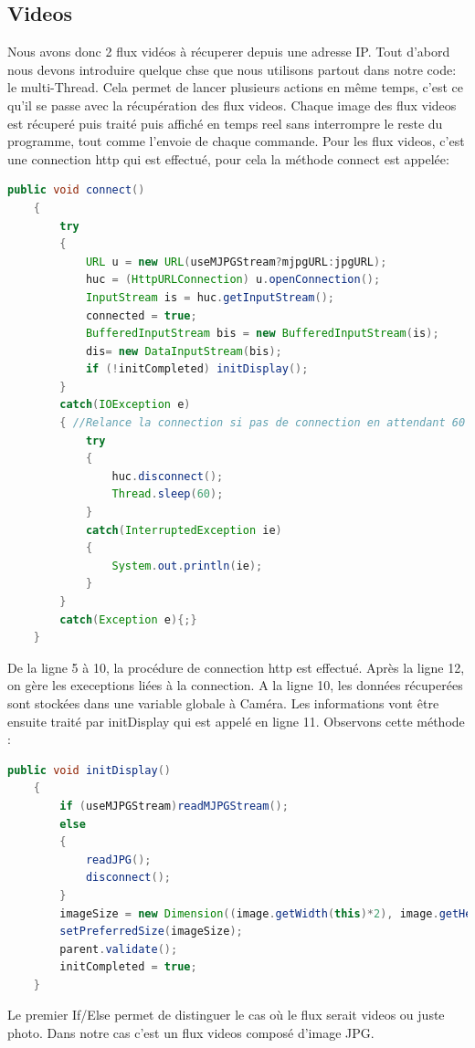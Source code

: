 \documentclass[a4paper,11pt]{report}
\begin{document}
		\subsection{Videos}
		Nous avons donc 2 flux vidéos à récuperer depuis une adresse IP. Tout d'abord nous devons introduire quelque chse que nous utilisons partout dans notre code: le multi-Thread. Cela permet de lancer plusieurs actions en même temps, c'est ce qu'il se passe avec la récupération des flux videos. Chaque image des flux videos est récuperé puis traité puis affiché en temps reel sans interrompre le reste du programme, tout comme l'envoie de chaque commande.
		\newline Pour les flux videos, c'est une connection http qui est effectué, pour cela la méthode connect est appelée:
		\begin{lstlisting}[language=java]
public void connect()
	{
		try
		{
			URL u = new URL(useMJPGStream?mjpgURL:jpgURL);
			huc = (HttpURLConnection) u.openConnection();
			InputStream is = huc.getInputStream();
			connected = true;
			BufferedInputStream bis = new BufferedInputStream(is);
			dis= new DataInputStream(bis);
			if (!initCompleted) initDisplay();
		}
		catch(IOException e)
		{ //Relance la connection si pas de connection en attendant 60 sec
			try
			{
				huc.disconnect();
				Thread.sleep(60);
			}
			catch(InterruptedException ie)
			{
				System.out.println(ie);
			}
		}
		catch(Exception e){;}
	}
			\end{lstlisting}
			De la ligne 5 à 10, la procédure de connection http est effectué.
			\newline Après la ligne 12, on gère les execeptions liées à la connection.
			\newline A la ligne 10, les données récuperées sont stockées dans une variable globale à Caméra.
			\newline Les informations vont être ensuite traité par initDisplay qui est appelé en ligne 11.
			\newline Observons cette méthode :
		\begin{lstlisting}[language=java]
public void initDisplay()
	{ 
		if (useMJPGStream)readMJPGStream();
		else
		{
			readJPG();
			disconnect();
		}
		imageSize = new Dimension((image.getWidth(this)*2), image.getHeight(this)*2);
		setPreferredSize(imageSize);
		parent.validate();
		initCompleted = true;
	}
		\end{lstlisting}
		Le premier If/Else permet de distinguer le cas où le flux serait videos ou juste photo. Dans notre cas c'est un flux videos composé d'image JPG.
\end{document}
